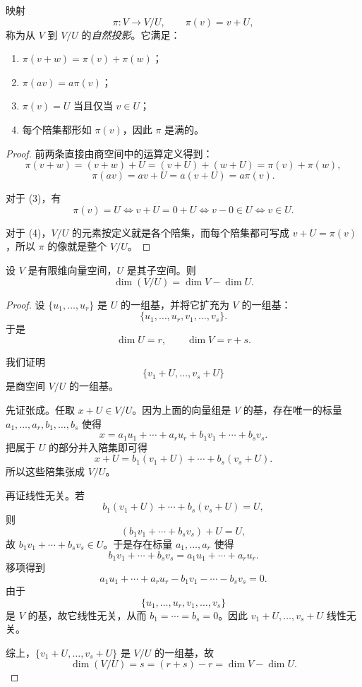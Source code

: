 \begin{theorem}[自然投影]
映射
\[
\pi:V\to V/U,\qquad \pi(v)=v+U,
\]
称为从 $V$ 到 $V/U$ 的\emph{自然投影}。它满足：
\begin{enumerate}[label=\textnormal{(\arabic*)}]
  \item $\pi(v+w)=\pi(v)+\pi(w)$；
  \item $\pi(av)=a\pi(v)$；
  \item $\pi(v)=U$ 当且仅当 $v\in U$；
  \item 每个陪集都形如 $\pi(v)$，因此 $\pi$ 是满的。
\end{enumerate}
\end{theorem}

\begin{proof}
前两条直接由商空间中的运算定义得到：
\[
\pi(v+w)=(v+w)+U=(v+U)+(w+U)=\pi(v)+\pi(w),
\]
\[
\pi(av)=av+U=a(v+U)=a\pi(v).
\]

对于 (3)，有
\[
\pi(v)=U\iff v+U=0+U\iff v-0\in U\iff v\in U.
\]

对于 (4)，$V/U$ 的元素按定义就是各个陪集，而每个陪集都可写成 $v+U=\pi(v)$，所以 $\pi$ 的像就是整个 $V/U$。
\end{proof}

\begin{theorem}[商空间的维数公式]
设 $V$ 是有限维向量空间，$U$ 是其子空间。则
\[
\dim(V/U)=\dim V-\dim U.
\]
\end{theorem}

\begin{proof}
设 $\{u_1,\dots,u_r\}$ 是 $U$ 的一组基，并将它扩充为 $V$ 的一组基：
\[
\{u_1,\dots,u_r,v_1,\dots,v_s\}.
\]
于是
\[
\dim U=r,\qquad \dim V=r+s.
\]

我们证明
\[
\{v_1+U,\dots,v_s+U\}
\]
是商空间 $V/U$ 的一组基。

先证张成。任取 $x+U\in V/U$。因为上面的向量组是 $V$ 的基，存在唯一的标量 $a_1,\dots,a_r,b_1,\dots,b_s$ 使得
\[
x=a_1u_1+\cdots+a_ru_r+b_1v_1+\cdots+b_sv_s.
\]
把属于 $U$ 的部分并入陪集即可得
\[
x+U=b_1(v_1+U)+\cdots+b_s(v_s+U).
\]
所以这些陪集张成 $V/U$。

再证线性无关。若
\[
b_1(v_1+U)+\cdots+b_s(v_s+U)=U,
\]
则
\[
(b_1v_1+\cdots+b_sv_s)+U=U,
\]
故 $b_1v_1+\cdots+b_sv_s\in U$。于是存在标量 $a_1,\dots,a_r$ 使得
\[
b_1v_1+\cdots+b_sv_s=a_1u_1+\cdots+a_ru_r.
\]
移项得到
\[
a_1u_1+\cdots+a_ru_r-b_1v_1-\cdots-b_sv_s=0.
\]
由于
\[
\{u_1,\dots,u_r,v_1,\dots,v_s\}
\]
是 $V$ 的基，故它线性无关，从而 $b_1=\cdots=b_s=0$。因此 $v_1+U,\dots,v_s+U$ 线性无关。

综上，$\{v_1+U,\dots,v_s+U\}$ 是 $V/U$ 的一组基，故
\[
\dim(V/U)=s=(r+s)-r=\dim V-\dim U.
\]
\end{proof}

